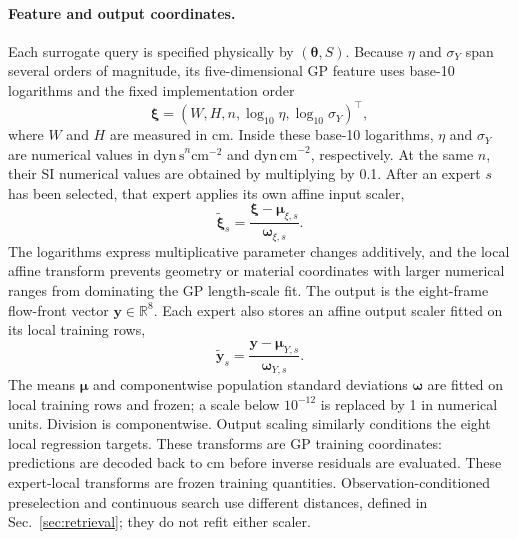 \paragraph{Feature and output coordinates.}
Each surrogate query is specified physically by
$(\boldsymbol{\theta},S)$.  Because $\eta$ and $\sigma_Y$ span several
orders of magnitude, its five-dimensional GP feature uses base-10
logarithms and the fixed implementation order
\begin{equation}
\label{eq:gp-feature}
    \boldsymbol{\xi}
    =(W,H,n,\log_{10}\eta,\log_{10}\sigma_Y)^\top,
\end{equation}
where $W$ and $H$ are measured in cm. Inside these base-10 logarithms,
$\eta$ and $\sigma_Y$ are numerical values in
$\mathrm{dyn\,s}^{n}\mathrm{cm}^{-2}$ and
$\mathrm{dyn\,cm}^{-2}$, respectively. At the same $n$, their SI
numerical values are obtained by multiplying by 0.1. After an expert $s$ has been
selected, that expert applies its own affine input scaler,
\begin{equation}
\label{eq:xscale}
    \tilde{\boldsymbol{\xi}}_s
    =
    \frac{\boldsymbol{\xi}-\boldsymbol{\mu}_{\xi,s}}
         {\boldsymbol{\omega}_{\xi,s}} .
\end{equation}
The logarithms express multiplicative parameter changes additively, and
the local affine transform prevents geometry or material coordinates
with larger numerical ranges from dominating the GP length-scale fit.
The output is the eight-frame flow-front vector
$\mathbf{y}\in\mathbb{R}^{8}$. Each expert also stores an affine output
scaler fitted on its local training rows,
\begin{equation}
\label{eq:yscale}
    \tilde{\mathbf{y}}_s
    =
    \frac{\mathbf{y}-\boldsymbol{\mu}_{Y,s}}
         {\boldsymbol{\omega}_{Y,s}} .
\end{equation}
The means $\boldsymbol\mu$ and componentwise population standard
deviations $\boldsymbol\omega$ are fitted on local training rows and
frozen; a scale below $10^{-12}$ is replaced by 1 in numerical units. Division is componentwise.
Output scaling similarly conditions the eight local regression targets.
These transforms are GP training coordinates: predictions are decoded back to cm
before inverse residuals are evaluated. These expert-local transforms
are frozen training quantities. Observation-conditioned preselection
and continuous search use different distances, defined in
Sec.~\ref{sec:retrieval}; they do not refit either scaler.

